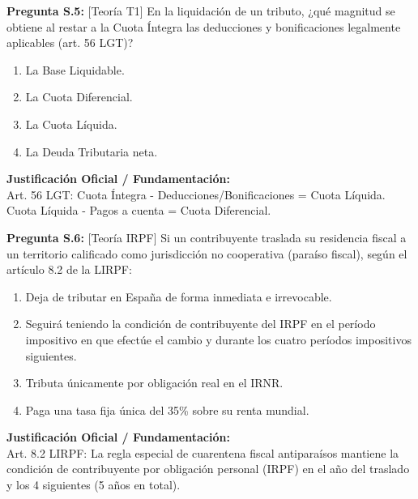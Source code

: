 \documentclass[11pt,a4paper,openany]{article}
\begin{document}
\noindent\textbf{\sffamily Pregunta S.5:} [Teoría T1] En la liquidación de un tributo, ¿qué magnitud se obtiene al restar a la Cuota Íntegra las deducciones y bonificaciones legalmente aplicables (art. 56 LGT)?\\[0.15cm]
\begin{enumerate}[label=\textbf{\alph*)},leftmargin=1.8em,itemsep=1.5pt,topsep=2pt,partopsep=0pt,parsep=0pt]
    \item La Base Liquidable.
    \item La Cuota Diferencial.
    \item La Cuota Líquida.
    \item La Deuda Tributaria neta.
\end{enumerate}
\begin{solucionBox}
\textbf{Justificación Oficial / Fundamentación:}\\[0.1cm]
Art. 56 LGT: Cuota Íntegra - Deducciones/Bonificaciones = Cuota Líquida. Cuota Líquida - Pagos a cuenta = Cuota Diferencial.
\end{solucionBox}
\vspace{0.35cm}

\noindent\textbf{\sffamily Pregunta S.6:} [Teoría IRPF] Si un contribuyente traslada su residencia fiscal a un territorio calificado como jurisdicción no cooperativa (paraíso fiscal), según el artículo 8.2 de la LIRPF:\\[0.15cm]
\begin{enumerate}[label=\textbf{\alph*)},leftmargin=1.8em,itemsep=1.5pt,topsep=2pt,partopsep=0pt,parsep=0pt]
    \item Deja de tributar en España de forma inmediata e irrevocable.
    \item Seguirá teniendo la condición de contribuyente del IRPF en el período impositivo en que efectúe el cambio y durante los cuatro períodos impositivos siguientes.
    \item Tributa únicamente por obligación real en el IRNR.
    \item Paga una tasa fija única del 35\% sobre su renta mundial.
\end{enumerate}
\begin{solucionBox}
\textbf{Justificación Oficial / Fundamentación:}\\[0.1cm]
Art. 8.2 LIRPF: La regla especial de cuarentena fiscal antiparaísos mantiene la condición de contribuyente por obligación personal (IRPF) en el año del traslado y los 4 siguientes (5 años en total).
\end{solucionBox}
\vspace{0.35cm}
\end{document}
